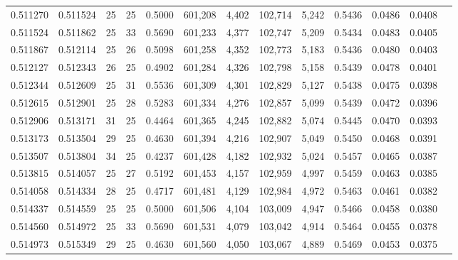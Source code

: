 \begin{tabular}{rrrrrrrrrrrrr}
0.511270 & 0.511524 &    25 &  25 &                                     0.5000 & 601,208 &   4,402 & 102,714 &   5,242 & 0.5436 & 0.0486 & 0.0408 \\
0.511524 & 0.511862 &    25 &  33 &                                     0.5690 & 601,233 &   4,377 & 102,747 &   5,209 & 0.5434 & 0.0483 & 0.0405 \\
0.511867 & 0.512114 &    25 &  26 &                                     0.5098 & 601,258 &   4,352 & 102,773 &   5,183 & 0.5436 & 0.0480 & 0.0403 \\
0.512127 & 0.512343 &    26 &  25 &                                     0.4902 & 601,284 &   4,326 & 102,798 &   5,158 & 0.5439 & 0.0478 & 0.0401 \\
0.512344 & 0.512609 &    25 &  31 &                                     0.5536 & 601,309 &   4,301 & 102,829 &   5,127 & 0.5438 & 0.0475 & 0.0398 \\
0.512615 & 0.512901 &    25 &  28 &                                     0.5283 & 601,334 &   4,276 & 102,857 &   5,099 & 0.5439 & 0.0472 & 0.0396 \\
0.512906 & 0.513171 &    31 &  25 &                                     0.4464 & 601,365 &   4,245 & 102,882 &   5,074 & 0.5445 & 0.0470 & 0.0393 \\
0.513173 & 0.513504 &    29 &  25 &                                     0.4630 & 601,394 &   4,216 & 102,907 &   5,049 & 0.5450 & 0.0468 & 0.0391 \\
0.513507 & 0.513804 &    34 &  25 &                                     0.4237 & 601,428 &   4,182 & 102,932 &   5,024 & 0.5457 & 0.0465 & 0.0387 \\
0.513815 & 0.514057 &    25 &  27 &                                     0.5192 & 601,453 &   4,157 & 102,959 &   4,997 & 0.5459 & 0.0463 & 0.0385 \\
0.514058 & 0.514334 &    28 &  25 &                                     0.4717 & 601,481 &   4,129 & 102,984 &   4,972 & 0.5463 & 0.0461 & 0.0382 \\
0.514337 & 0.514559 &    25 &  25 &                                     0.5000 & 601,506 &   4,104 & 103,009 &   4,947 & 0.5466 & 0.0458 & 0.0380 \\
0.514560 & 0.514972 &    25 &  33 &                                     0.5690 & 601,531 &   4,079 & 103,042 &   4,914 & 0.5464 & 0.0455 & 0.0378 \\
0.514973 & 0.515349 &    29 &  25 &                                     0.4630 & 601,560 &   4,050 & 103,067 &   4,889 & 0.5469 & 0.0453 & 0.0375 \\

\end{tabular}
